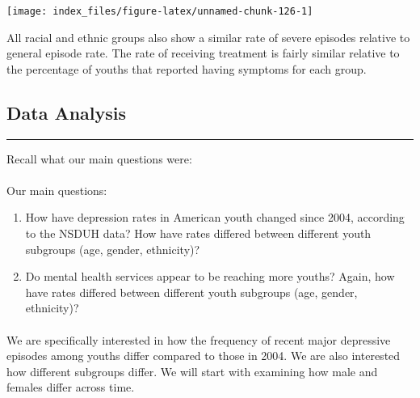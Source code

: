 \documentclass[
]{article}
\providecommand{\tightlist}{%
  \setlength{\itemsep}{0pt}\setlength{\parskip}{0pt}}
\begin{document}
\begin{center}\texttt{[image: index\_files/figure-latex/unnamed-chunk-126-1]} \end{center}

All racial and ethnic groups also show a similar rate of severe episodes
relative to general episode rate. The rate of receiving treatment is
fairly similar relative to the percentage of youths that reported having
symptoms for each group.

\hypertarget{data-analysis}{%
\subsection{\texorpdfstring{\textbf{Data
Analysis}}{Data Analysis}}\label{data-analysis}}

\begin{center}\rule{0.5\linewidth}{0.5pt}\end{center}

Recall what our main questions were:

\hypertarget{section-40}{%
\paragraph{}\label{section-40}}

Our main questions:

\begin{enumerate}
\def\labelenumi{\arabic{enumi}.}
\tightlist
\item
  How have depression rates in American youth changed since 2004,
  according to the NSDUH data? How have rates differed between different
  youth subgroups (age, gender, ethnicity)?
\item
  Do mental health services appear to be reaching more youths? Again,
  how have rates differed between different youth subgroups (age,
  gender, ethnicity)?
\end{enumerate}

\hypertarget{section-41}{%
\paragraph{}\label{section-41}}

We are specifically interested in how the frequency of recent major
depressive episodes among youths differ compared to those in 2004. We
are also interested how different subgroups differ. We will start with
examining how male and females differ across time.
\end{document}
